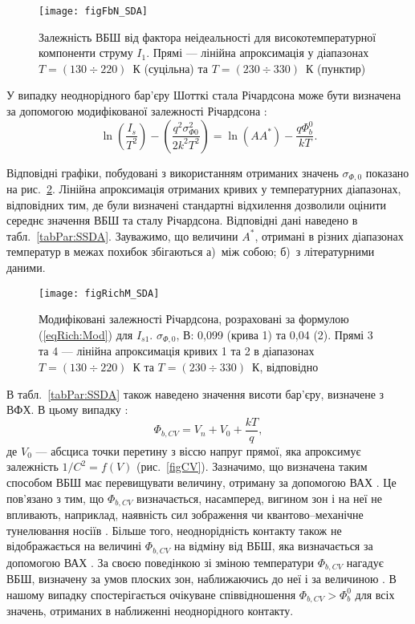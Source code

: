 \begin{figure}
\center
\texttt{[image: figFbN\_SDA]}
\caption{\label{figFbN_SDA}
Залежність ВБШ від фактора неідеальності для високотемпературної компоненти струму $I_1$.
Прямі --- лінійна апроксимація у діапазонах $T=(130\div220)$~К (суцільна) та $T=(230\div330)$~К (пунктир)
}%
\end{figure}

У випадку неоднорідного бар'єру Шотткі стала Річардсона може бути визначена за
допомогою модифікованої залежності Річардсона \cite{Tascioglu2010old,Yildirim2010}:
\begin{equation} \label{eqRich:Mod}
\ln\left(\frac{I_s}{T^2}\right)-\left(\frac{q^2\sigma_{\Phi0}^2}{2k^2T^2}\right)=\ln(AA^*)-\frac{q\Phi_b^0}{kT}.
\end{equation}

Відповідні графіки, побудовані з використанням отриманих значень $\sigma_{\Phi,0}$ показано на рис.~\ref{figRichM_SDA}.
Лінійна апроксимація отриманих кривих у температурних діапазонах, відповідних тим, де були визначені стандартні відхилення
дозволили оцінити середнє значення ВБШ та сталу Річардсона.
Відповідні дані наведено в табл.~\ref{tabPar:SSDA}.
Зауважимо, що величини $A^*$, отримані в різних діапазонах температур в межах похибок збігаються
а)~між собою;
б)~з літературними даними.


\begin{figure}
\center
\texttt{[image: figRichM\_SDA]}
\caption{\label{figRichM_SDA}
Модифіковані залежності Річардсона, розраховані за формулою (\ref{eqRich:Mod}) для $I_{s1}$.
$\sigma_{\Phi,0}$, В: 0,099 (крива 1) та 0,04 (2).
Прямі 3 та 4 --- лінійна апроксимація кривих 1 та 2 в діапазонах $T=(130\div220)$~К
та $T=(230\div330)$~К, відповідно
}%
\end{figure}

В табл.~\ref{tabPar:SSDA} також наведено значення висоти бар'єру, визначене з ВФХ.
В цьому випадку  \cite{Rhoderick1988,Schroder2006}:
\begin{equation}\label{eqFbCV}
\Phi_{b,CV}=V_n+V_0+\frac{kT}{q},
\end{equation}
де
$V_0$ --- абсциса точки перетину з віссю напруг прямої, яка апроксимує залежність $1/C^2=f(V)$ (рис.~\ref{figCV}).
Зазначимо, що визначена таким способом ВБШ має перевищувати величину, отриману за допомогою ВАХ
\cite{Rhoderick1988,GELCZUK2014,Mohan,Cetin2005,Soylu,Yildirim2010,Karatas:2006NIMA}.
Це пов'язано з тим, що $\Phi_{b,CV}$ визначається, насамперед, вигином зон і на неї не впливають, наприклад,
наявність сил зображення чи квантово--механічне тунелювання носіїв \cite{Rhoderick1988,GELCZUK2014,Mohan}.
Більше того, неоднорідність контакту також не відображається на величині $\Phi_{b,CV}$ на відміну від ВБШ,
яка визначається за допомогою ВАХ \cite{Sullivan,Tung:PhysRev,GELCZUK2014,Mohan}.
За своєю поведінкою зі зміною температури $\Phi_{b,CV}$ нагадує ВБШ, визначену за умов плоских зон, наближаючись
до неї і за величиною \cite{Cetin2005,Soylu,Yildirim2010,Mohan}.
В нашому випадку спостерігається очікуване співвідношення $\Phi_{b,CV}>\Phi_b^0$ для всіх значень, отриманих
в наближенні неоднорідного контакту.

